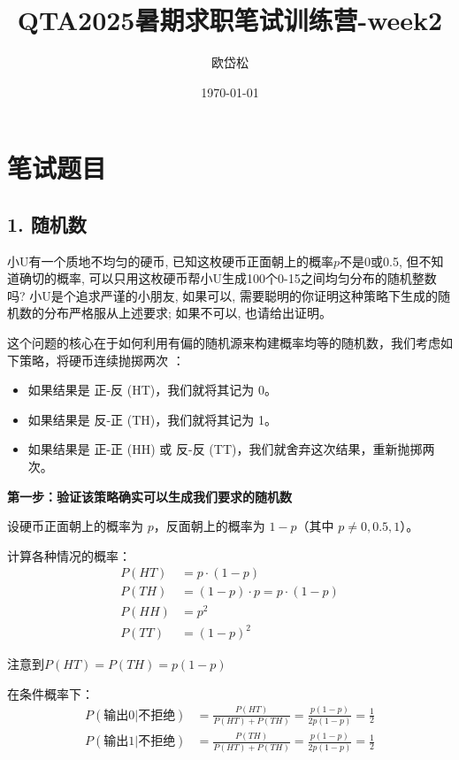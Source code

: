 \documentclass[UTF8]{ctexart}
\title{QTA2025暑期求职笔试训练营-week2}
\author{欧岱松}
\date{\today{}}
\begin{document}
\maketitle

\section*{笔试题目}

\subsection*{1. 随机数}
小U有一个质地不均匀的硬币, 已知这枚硬币正面朝上的概率$p$不是0或0.5, 但不知道确切的概率, 可以只用这枚硬币帮小U生成100个0-15之间均匀分布的随机整数吗? 小U是个追求严谨的小朋友, 如果可以, 需要聪明的你证明这种策略下生成的随机数的分布严格服从上述要求; 如果不可以, 也请给出证明。

这个问题的核心在于如何利用有偏的随机源来构建概率均等的随机数，我们考虑如下策略，将硬币连续抛掷两次 ：
\begin{itemize}
    \item 如果结果是 正-反 (HT)，我们就将其记为 0。

    \item 如果结果是 反-正 (TH)，我们就将其记为 1。
    
    \item 如果结果是 正-正 (HH) 或 反-反 (TT)，我们就舍弃这次结果，重新抛掷两次。    
    
\end{itemize}

\textbf{第一步：验证该策略确实可以生成我们要求的随机数}

设硬币正面朝上的概率为 $p$，反面朝上的概率为 $1-p$（其中 $p \neq 0, 0.5, 1$）。

计算各种情况的概率：
\begin{align}
P(HT) &= p \cdot (1-p) \\
P(TH) &= (1-p) \cdot p = p \cdot (1-p) \\
P(HH) &= p^2 \\
P(TT) &= (1-p)^2
\end{align}

注意到$P(HT) = P(TH) = p(1-p)$

在条件概率下：
\begin{align}
P(\text{输出0} | \text{不拒绝}) &= \frac{P(HT)}{P(HT) + P(TH)} =
\frac{p(1-p)}{2p(1-p)} = \frac{1}{2} \\
P(\text{输出1} | \text{不拒绝}) &= \frac{P(TH)}{P(HT) + P(TH)} =
\frac{p(1-p)}{2p(1-p)} = \frac{1}{2}
\end{align}
\end{document}

